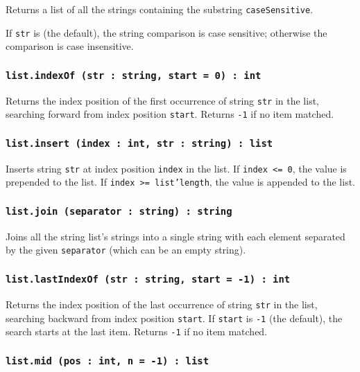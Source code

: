 Returns a list of all the strings containing the substring \texttt{caseSensitive}.

If \texttt{str} is \true{} (the default), the string comparison is case sensitive; otherwise the comparison is case insensitive.

\subsubsection{\texttt{list.indexOf (str : string, start = 0) : int}}

Returns the index position of the first occurrence of string \texttt{str} in the list, searching forward from index position \texttt{start}. Returns \texttt{-1} if no item matched.

\subsubsection{\texttt{list.insert (index : int, str : string) : list}}

Inserts string \texttt{str} at index position \texttt{index} in the list. If \texttt{index <= 0}, the value is prepended to the list. If \texttt{index >= list'length}, the value is appended to the list.

\subsubsection{\texttt{list.join (separator : string) : string}}

Joins all the string list's strings into a single string with each element separated by the given \texttt{separator} (which can be an empty string).

\subsubsection{\texttt{list.lastIndexOf (str : string, start = -1) : int}}

Returns the index position of the last occurrence of string \texttt{str} in the list, searching backward from index position \texttt{start}. If \texttt{start} is \texttt{-1} (the default), the search starts at the last item. Returns \texttt{-1} if no item matched.

\subsubsection{\texttt{list.mid (pos : int, n = -1) : list}}

